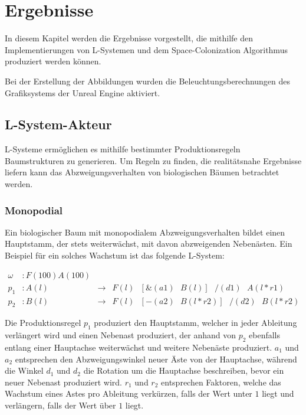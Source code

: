 \chapter{Ergebnisse}
In diesem Kapitel werden die Ergebnisse vorgestellt, die mithilfe den Implementierungen von L-Systemen und dem Space-Colonization Algorithmus produziert werden können.

Bei der Erstellung der Abbildungen wurden die Beleuchtungsberechnungen des Grafiksystems der Unreal Engine aktiviert.
\section{L-System-Akteur}
L-Systeme ermöglichen es mithilfe bestimmter Produktionsregeln Baumstrukturen zu generieren. Um Regeln zu finden, die realitätsnahe Ergebnisse liefern kann das Abzweigungsverhalten von biologischen Bäumen betrachtet werden.
\subsection{Monopodial}
Ein biologischer Baum mit monopodialem Abzweigungsverhalten bildet einen Hauptstamm, der stets weiterwächst, mit davon abzweigenden Nebenästen. \cite[S.21]{Forstbonatik:17} Ein Beispiel für ein solches Wachstum ist das folgende L-System:

\begin{equation}
\begin{array}{llll}
\omega & : F(100)A(100) \\
p_1 & : A(l) &\rightarrow& F(l)\text{ }[\&(a1)\text{ }B(l)]\text{ }/(d1)\text{ }A(l*r1) \\
p_2 &  : B(l) &\rightarrow& F(l)\text{ }[-(a2)\text{ }B(l*r2)]\text{ }/(d2)\text{ }B(l*r2)
\end{array}
\label{eq:ProdMonopodial}
\end{equation} 

Die Produktionsregel $p_1$ produziert den Hauptstamm, welcher in jeder Ableitung verlängert wird und einen Nebenast produziert, der anhand von $p_2$ ebenfalls entlang einer Hauptachse weiterwächst und weitere Nebenäste produziert. $a_1$ und $a_2$ entsprechen den Abzweigungswinkel neuer Äste von der Hauptachse, während die Winkel $d_1$ und $d_2$ die Rotation um die Hauptachse beschreiben, bevor ein neuer Nebenast produziert wird. $r_1$ und $r_2$ entsprechen Faktoren, welche das Wachstum eines Astes pro Ableitung verkürzen, falls der Wert unter $1$ liegt und verlängern, falls der Wert über $1$ liegt.

